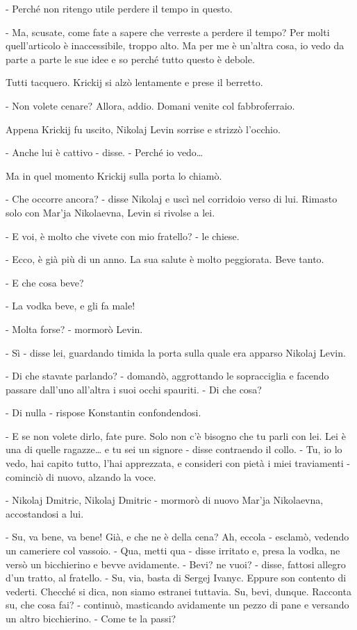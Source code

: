 - Perché non ritengo utile perdere il tempo in questo. 

- Ma, scusate, come fate a sapere che verreste a perdere il tempo? Per molti quell'articolo è inaccessibile, troppo alto. Ma per me è un'altra cosa, io vedo da parte a parte le sue idee e so perché tutto questo è debole. 

Tutti tacquero. Krickij si alzò lentamente e prese il berretto. 

- Non volete cenare? Allora, addio. Domani venite col fabbroferraio. 

Appena Krickij fu uscito, Nikolaj Levin sorrise e strizzò l'occhio. 

- Anche lui è cattivo - disse. - Perché io vedo\ldots{} 

Ma in quel momento Krickij sulla porta lo chiamò. 

- Che occorre ancora? - disse Nikolaj e uscì nel corridoio verso di lui. Rimasto solo con Mar'ja Nikolaevna, Levin si rivolse a lei. 

- E voi, è molto che vivete con mio fratello? - le chiese. 

- Ecco, è già più di un anno. La sua salute è molto peggiorata. Beve tanto. 

- E che cosa beve? 

- La vodka beve, e gli fa male! 

- Molta forse? - mormorò Levin. 

- Sì - disse lei, guardando timida la porta sulla quale era apparso Nikolaj Levin. 

- Di che stavate parlando? - domandò, aggrottando le sopracciglia e facendo passare dall'uno all'altra i suoi occhi spauriti. - Di che cosa? 

- Di nulla - rispose Konstantin confondendosi. 

- E se non volete dirlo, fate pure. Solo non c'è bisogno che tu parli con lei. Lei è una di quelle ragazze\ldots{} e tu sei un signore - disse contraendo il collo. - Tu, io lo vedo, hai capito tutto, l'hai apprezzata, e consideri con pietà i miei traviamenti - cominciò di nuovo, alzando la voce. 

- Nikolaj Dmitric, Nikolaj Dmitric - mormorò di nuovo Mar'ja Nikolaevna, accostandosi a lui. 

- Su, va bene, va bene! Già, e che ne è della cena? Ah, eccola - esclamò, vedendo un cameriere col vassoio. - Qua, metti qua - disse irritato e, presa la vodka, ne versò un bicchierino e bevve avidamente. - Bevi? ne vuoi? - disse, fattosi allegro d'un tratto, al fratello. - Su, via, basta di Sergej Ivanyc. Eppure son contento di vederti. Checché si dica, non siamo estranei tuttavia. Su, bevi, dunque. Racconta su, che cosa fai? - continuò, masticando avidamente un pezzo di pane e versando un altro bicchierino. - Come te la passi? 

